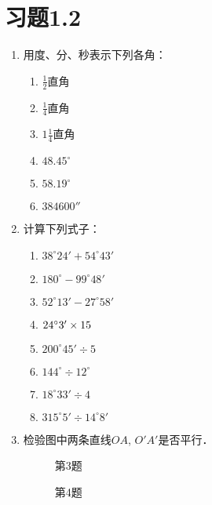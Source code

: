 \section*{习题1.2}
\begin{enumerate}
	\item 用度、分、秒表示下列各角：
\begin{multicols}{3}
\begin{enumerate}
	\item $\frac{1}{2}$直角
	\item  $\frac{1}{4}$直角
	\item $1\frac{1}{4}$直角
	\item $48.45^{\circ}$
\item 	$58.19^{\circ}$
\item $384600''$
\end{enumerate}
\end{multicols}
\item 计算下列式子：
\begin{multicols}{2}
\begin{enumerate}
\item $38^{\circ}24'+54^{\circ}43'$
\item $180^{\circ}-99^{\circ}48'$
\item $52^{\circ}13'-27^{\circ}58'$
\item $24^{\circ}3'\times 15$
\item $200^{\circ}45'\div 5$
\item $144^{\circ}\div 12^{\circ}$
\item $18^{\circ}33'\div 4$
\item $315^{\circ}5'\div 14^{\circ}8'$
\end{enumerate}
\end{multicols}

\item 检验图中两条直线$OA$, $O'A'$是否平行．

\begin{figure}[htp]\centering
    \begin{minipage}[t]{0.48\textwidth}
    \centering
{}
    \caption*{第3题}
    \end{minipage}
    \begin{minipage}[t]{0.48\textwidth}
    \centering
    \caption*{第4题}
    \end{minipage}
    \end{figure}


\end{enumerate}
